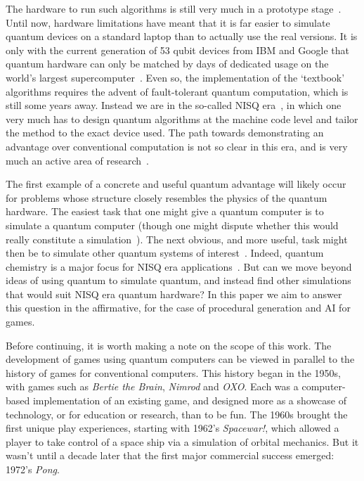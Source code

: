 \documentclass[conference]{IEEEtran}
\begin{document}
The hardware to run such algorithms is still very much in a prototype stage~\cite{quantum-volume}. Until now, hardware limitations have meant that it is far easier to simulate quantum devices on a standard laptop than to actually use the real versions. It is only with the current generation of 53 qubit devices from IBM and Google that quantum hardware can only be matched by days of dedicated usage on the world’s largest supercomputer~\cite{google-supremacy,ibm-summit}. Even so, the implementation of the ‘textbook’ algorithms requires the advent of fault-tolerant quantum computation, which is still some years away. Instead we are in the so-called NISQ era~\cite{nisq}, in which one very much has to design quantum algorithms at the machine code level and tailor the method to the exact device used. The path towards demonstrating an advantage over conventional computation is not so clear in this era, and is very much an active area of research~\cite{ibm-nisq}.

The first example of a concrete and useful quantum advantage will likely occur for problems whose structure closely resembles the physics of the quantum hardware. The easiest task that one might give a quantum computer is to simulate a quantum computer (though one might dispute whether this would really constitute a simulation~\cite{horsman:13}). The next obvious, and more useful, task might then be to simulate other quantum systems of interest~\cite{feynman}. Indeed, quantum chemistry is a major focus for NISQ era applications~\cite{kandala:17,ganzhorn:19}. But can we move beyond ideas of using quantum to simulate quantum, and instead find other simulations that would suit NISQ era quantum hardware? In this paper we aim to answer this question in the affirmative, for the case of procedural generation and AI for games.

Before continuing, it is worth making a note on the scope of this work. The development of games using quantum computers can be viewed in parallel to the history of games for conventional computers. This history began in the 1950s, with games such as  \textit{Bertie the Brain},  \textit{Nimrod} and  \textit{OXO}. Each was a computer-based implementation of an existing game, and designed more as a showcase of technology, or for education or research, than to be fun. The 1960s brought the first unique play experiences, starting with 1962’s \textit{Spacewar!}, which allowed a player to take control of a space ship via a simulation of orbital mechanics. But it wasn’t until a decade later that the first major commercial success emerged: 1972’s  \textit{Pong}.
\end{document}
